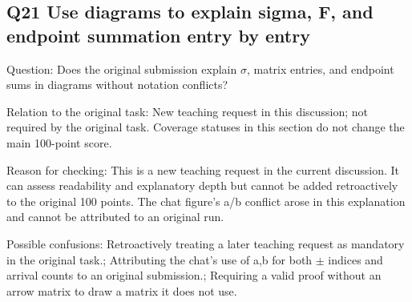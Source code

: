 \documentclass[11pt,a4paper]{article}
\begin{document}
\clearpage
\subsection{Q21 Use diagrams to explain sigma,\allowbreak{} F,\allowbreak{} and endpoint summation entry by entry}
\label{aspect:Q21}
Question: Does the original submission explain \ensuremath{\sigma},\allowbreak{} matrix entries,\allowbreak{} and endpoint sums in diagrams without notation conflicts?

Relation to the original task: New teaching request in this discussion; not required by the original task. Coverage statuses in this section do not change the main 100-point score.

Reason for checking: This is a new teaching request in the current discussion. It can assess readability and explanatory depth but cannot be added retroactively to the original 100 points. The chat figure’s a/\allowbreak{}b conflict arose in this explanation and cannot be attributed to an original run.

Possible confusions: Retroactively treating a later teaching request as mandatory in the original task.; Attributing the chat’s use of a,\allowbreak{}b for both \ensuremath{\pm} indices and arrival counts to an original submission.; Requiring a valid proof without an arrow matrix to draw a matrix it does not use.
\end{document}
